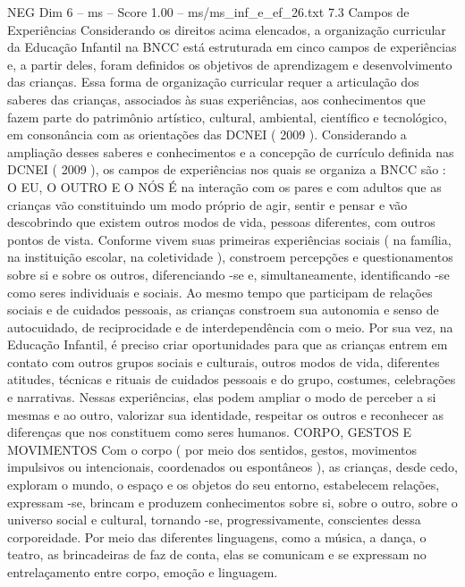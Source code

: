 \begin{textsample}{NEG Dim 6 – ms – Score 1.00 – ms/ms\_inf\_e\_ef\_26.txt}  \label{ex:f6_neg_238}
7.3 Campos de Experiências Considerando os direitos acima elencados, a organização curricular da Educação Infantil na BNCC está estruturada em cinco campos de experiências e, a partir deles, foram definidos os objetivos de aprendizagem e desenvolvimento das crianças.
Essa forma de organização curricular requer a articulação dos saberes das crianças, associados às suas experiências, aos conhecimentos que fazem parte do patrimônio artístico, cultural, ambiental, científico e tecnológico, em consonância com as orientações das DCNEI ( 2009 ).
Considerando a ampliação desses saberes e conhecimentos e a concepção de currículo definida nas DCNEI ( 2009 ), os campos de experiências nos quais se organiza a BNCC são : O EU, O OUTRO E O NÓS É na interação com os pares e com adultos que as crianças vão constituindo um modo próprio de agir, sentir e pensar e vão descobrindo que existem outros modos de vida, pessoas diferentes, com outros pontos de vista.
Conforme vivem suas primeiras experiências sociais ( na família, na instituição escolar, na coletividade ), constroem percepções e questionamentos sobre si e sobre os outros, diferenciando -se e, simultaneamente, identificando -se como seres individuais e sociais.
Ao mesmo tempo que participam de relações sociais e de cuidados pessoais, as crianças constroem sua autonomia e senso de autocuidado, de reciprocidade e de interdependência com o meio.
Por sua vez, na Educação Infantil, é preciso criar oportunidades para que as crianças entrem em contato com outros grupos sociais e culturais, outros modos de vida, diferentes atitudes, técnicas e rituais de cuidados pessoais e do grupo, costumes, celebrações e narrativas.
Nessas experiências, elas podem ampliar o modo de perceber a si mesmas e ao outro, valorizar sua identidade, respeitar os outros e reconhecer as diferenças que nos constituem como seres humanos.
CORPO, GESTOS E MOVIMENTOS Com o corpo ( por meio dos sentidos, gestos, movimentos impulsivos ou intencionais, coordenados ou espontâneos ), as crianças, desde cedo, exploram o mundo, o espaço e os objetos do seu entorno, estabelecem relações, expressam -se, brincam e produzem conhecimentos sobre si, sobre o outro, sobre o universo social e cultural, tornando -se, progressivamente, conscientes dessa corporeidade.
Por meio das diferentes linguagens, como a música, a dança, o teatro, as brincadeiras de faz de conta, elas se comunicam e se expressam no entrelaçamento entre corpo, emoção e linguagem.

\end{textsample}

